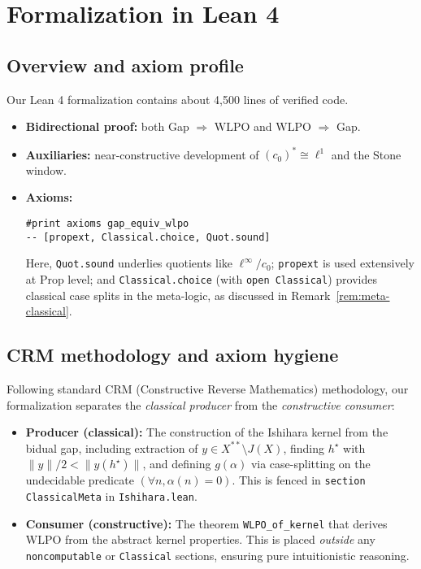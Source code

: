 \documentclass[11pt]{article}
\newcommand{\linf}{\ell^\infty}
\newcommand{\cnull}{c_0}
\newcommand{\WLPO}{\mathrm{WLPO}}
\begin{document}
\section{Formalization in Lean 4}\label{sec:lean}

\subsection{Overview and axiom profile}\label{sec:axioms}

Our Lean 4 formalization contains about 4{,}500 lines of verified code.
\begin{itemize}
\item \textbf{Bidirectional proof:} both Gap $\Rightarrow$ $\WLPO$ and $\WLPO$ $\Rightarrow$ Gap.
\item \textbf{Auxiliaries:} near-constructive development of $(\cnull)^*\cong \ell^1$ and the Stone window.
\item \textbf{Axioms:}
\begin{lstlisting}[language=Lean,numbers=none]
#print axioms gap_equiv_wlpo
-- [propext, Classical.choice, Quot.sound]
\end{lstlisting}
Here, \texttt{Quot.sound} underlies quotients like $\linf/\cnull$; \texttt{propext} is used extensively at Prop level; and \texttt{Classical.choice} (with \texttt{open Classical}) provides classical case splits in the meta-logic, as discussed in Remark~\ref{rem:meta-classical}.
\end{itemize}

\subsection{CRM methodology and axiom hygiene}\label{sec:crm-hygiene}

Following standard CRM (Constructive Reverse Mathematics) methodology, our formalization 
separates the \emph{classical producer} from the \emph{constructive consumer}:

\begin{itemize}
\item \textbf{Producer (classical):} The construction of the Ishihara kernel from the bidual gap,
  including extraction of $y \in X^{**} \setminus J(X)$, finding $h^\star$ with $\|y\|/2 < \|y(h^\star)\|$,
  and defining $g(\alpha)$ via case-splitting on the undecidable predicate $(\forall n, \alpha(n) = 0)$.
  This is fenced in \texttt{section ClassicalMeta} in \texttt{Ishihara.lean}.

\item \textbf{Consumer (constructive):} The theorem \texttt{WLPO\_of\_kernel} that derives $\WLPO$ 
  from the abstract kernel properties. This is placed \emph{outside} any \texttt{noncomputable} or 
  \texttt{Classical} sections, ensuring pure intuitionistic reasoning.
\end{itemize}
\end{document}
